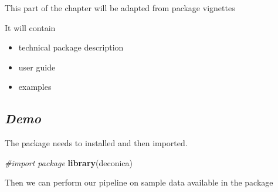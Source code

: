 \documentclass[12pt,]{book}
\newenvironment{Shaded}{\begin{snugshade}}{\end{snugshade}}
\newcommand{\KeywordTok}[1]{\textcolor[rgb]{0.13,0.29,0.53}{\textbf{#1}}}
\newcommand{\CommentTok}[1]{\textcolor[rgb]{0.56,0.35,0.01}{\textit{#1}}}
\newcommand{\NormalTok}[1]{#1}
\theoremstyle{definition}
\theoremstyle{definition}
\theoremstyle{definition}
\theoremstyle{remark}
\begin{document}
This part of the chapter will be adapted from package vignettes

It will contain

\begin{itemize}
\item
  technical package description
\item
  user guide
\item
  examples
\end{itemize}

\hypertarget{demo}{%
\subsection{\texorpdfstring{\emph{Demo}}{Demo}}\label{demo}}

The package needs to installed and then imported.

\begin{Shaded}
\begin{Highlighting}[]
\CommentTok{#import package}
\KeywordTok{library}\NormalTok{(deconica)}
\end{Highlighting}
\end{Shaded}

Then we can perform our pipeline on sample data available in the package
\end{document}
